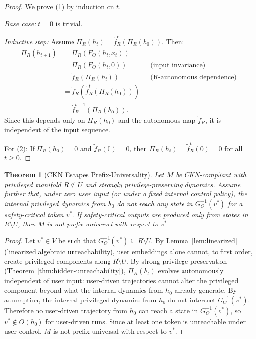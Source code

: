 \documentclass[11pt,a4paper]{article}
\newtheorem{theorem}{Theorem}[section]
\begin{document}
\begin{proof}
We prove (1) by induction on $t$.

\emph{Base case:} $t = 0$ is trivial.

\emph{Inductive step:} Assume $\Pi_R(h_t) = \tilde{f}_R^t(\Pi_R(h_0))$. Then:
\begin{align*}
\Pi_R(h_{t+1}) &= \Pi_R(F_\Theta(h_t, x_t)) \\
&= \Pi_R(F_\Theta(h_t, 0)) && \text{(input invariance)} \\
&= \tilde{f}_R(\Pi_R(h_t)) && \text{(R-autonomous dependence)} \\
&= \tilde{f}_R(\tilde{f}_R^t(\Pi_R(h_0))) \\
&= \tilde{f}_R^{t+1}(\Pi_R(h_0)).
\end{align*}
Since this depends only on $\Pi_R(h_0)$ and the autonomous map $\tilde{f}_R$, it is independent of the input sequence.

For (2): If $\Pi_R(h_0) = 0$ and $\tilde{f}_R(0) = 0$, then $\Pi_R(h_t) = \tilde{f}_R^t(0) = 0$ for all $t \geq 0$.
\end{proof}

\begin{theorem}[CKN Escapes Prefix-Universality]
\label{thm:ckn-escape}
Let $M$ be CKN-compliant with privileged manifold $R \not\subseteq U$ and strongly privilege-preserving dynamics. Assume further that, under zero user input (or under a fixed internal control policy), the internal privileged dynamics from $h_0$ do not reach any state in $G_\Theta^{-1}(v^*)$ for a safety-critical token $v^*$. If safety-critical outputs are produced only from states in $R \setminus U$, then $M$ is not prefix-universal with respect to $v^*$.
\end{theorem}

\begin{proof}
Let $v^* \in V$ be such that $G_\Theta^{-1}(v^*) \subseteq R \setminus U$. By Lemma~\ref{lem:linearized} (linearized algebraic unreachability), user embeddings alone cannot, to first order, create privileged components along $R \setminus U$. By strong privilege preservation (Theorem~\ref{thm:hidden-unreachability}), $\Pi_R(h_t)$ evolves autonomously independent of user input: user-driven trajectories cannot alter the privileged component beyond what the internal dynamics from $h_0$ already generate. By assumption, the internal privileged dynamics from $h_0$ do not intersect $G_\Theta^{-1}(v^*)$. Therefore no user-driven trajectory from $h_0$ can reach a state in $G_\Theta^{-1}(v^*)$, so $v^* \notin O(h_0)$ for user-driven runs. Since at least one token is unreachable under user control, $M$ is not prefix-universal with respect to $v^*$.
\end{proof}
\end{document}
